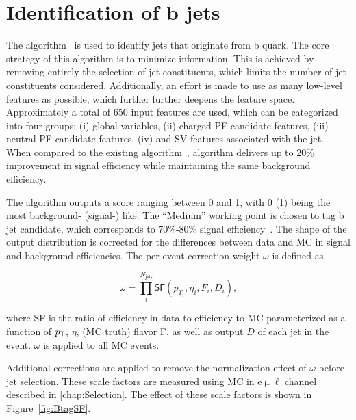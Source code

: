 \section{Identification of b jets}
\label{sec:Btag}

The \DeepJ algorithm~\cite{Bols:2020bkb} is used to identify jets that originate from b quark. The core strategy of this algorithm is to minimize information. This is achieved by removing entirely the selection of jet constituents, which limits the number of jet constituents considered. Additionally, an effort is made to use as many low-level features as possible, which further further deepens the feature space. Approximately a total of 650 input features are used, which can be categorized into four groups: (i) global variables, (ii) charged \ac{PF} candidate features, (iii) neutral \ac{PF} candidate features, (iv) and \ac{SV} features associated with the jet. When compared to the existing \DeepC algorithm~\cite{CMS:2017wtu}, \DeepJ algorithm delivers up to 20\% improvement in signal efficiency while maintaining the same background efficiency.

The \DeepJ algorithm outputs a score ranging between 0 and 1, with 0 (1) being the most background- (signal-) like. The ``Medium'' working point is chosen to tag b jet candidate, which corresponds to 70\%-80\% signal efficiency~\cite{CMS-DP-2018-058}. The shape of the \DeepJ output distribution is corrected for the differences between data and \ac{MC} in signal and background efficiencies. The per-event correction weight $ \omega$ is defined as,
 
 \begin{equation}
 \omega = \prod_{i}^{N_{\textsf{jets}}} \textsf{SF}(p_{T_{i}},\eta_i, F_i, D_i),
 \end{equation}
 
where \textsf{SF} is the ratio of efficiency in data to efficiency to \ac{MC} parameterized as a function of $p_{\textsf{T}}$, $\eta$, (\ac{MC} truth) flavor F, as well as \DeepJ output $D$ of each jet in the event. $\omega$ is applied to all \ac{MC} events.

Additional corrections are applied to remove the normalization effect of $\omega$ before jet selection. These scale factors are measured using \ac{MC} in e$\upmu\ell$ channel described in \autoref{chap:Selection}. The effect of these scale factors is shown in Figure~\ref{fig:BtagSF}.
 
